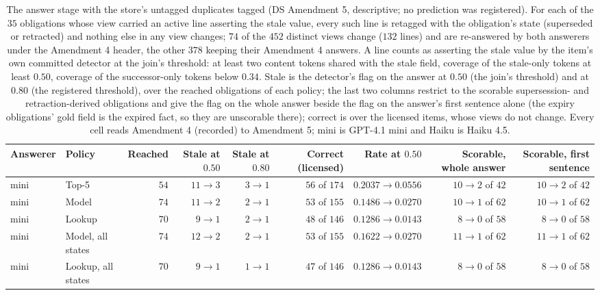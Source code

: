 \begin{table}[H]
\caption{The answer stage with the store's untagged duplicates tagged (DS Amendment 5, descriptive; no prediction was registered). For each of the $35$ obligations whose view carried an active line asserting the stale value, every such line is retagged with the obligation's state (superseded or retracted) and nothing else in any view changes; $74$ of the $452$ distinct views change ($132$ lines) and are re-answered by both answerers under the Amendment 4 header, the other $378$ keeping their Amendment 4 answers. A line counts as asserting the stale value by the item's own committed detector at the join's threshold: at least two content tokens shared with the stale field, coverage of the stale-only tokens at least $0.50$, coverage of the successor-only tokens below $0.34$. Stale is the detector's flag on the answer at $0.50$ (the join's threshold) and at $0.80$ (the registered threshold), over the reached obligations of each policy; the last two columns restrict to the scorable supersession- and retraction-derived obligations and give the flag on the whole answer beside the flag on the answer's first sentence alone (the expiry obligations' gold field is the expired fact, so they are unscorable there); correct is over the licensed items, whose views do not change. Every cell reads Amendment 4 (recorded) to Amendment 5; mini is GPT-4.1 mini and Haiku is Haiku 4.5.}
\label{tab:ds-a5}\centering\tiny\setlength{\tabcolsep}{2pt}
\begin{tabular}{@{}llrrrrrrr@{}}\toprule
Answerer & Policy & Reached & Stale at $0.50$ & Stale at $0.80$ & Correct (licensed) & Rate at $0.50$ & Scorable, whole answer & Scorable, first sentence \\ \midrule
mini & Top-5 & $54$ & $11 \to 3$ & $3 \to 1$ & $56$ of $174$ & $0.2037 \to 0.0556$ & $10 \to 2$ of $42$ & $10 \to 2$ of $42$ \\
mini & Model & $74$ & $11 \to 2$ & $2 \to 1$ & $53$ of $155$ & $0.1486 \to 0.0270$ & $10 \to 1$ of $62$ & $10 \to 1$ of $62$ \\
mini & Lookup & $70$ & $9 \to 1$ & $2 \to 1$ & $48$ of $146$ & $0.1286 \to 0.0143$ & $8 \to 0$ of $58$ & $8 \to 0$ of $58$ \\
mini & Model, all states & $74$ & $12 \to 2$ & $2 \to 1$ & $53$ of $155$ & $0.1622 \to 0.0270$ & $11 \to 1$ of $62$ & $11 \to 1$ of $62$ \\
mini & Lookup, all states & $70$ & $9 \to 1$ & $1 \to 1$ & $47$ of $146$ & $0.1286 \to 0.0143$ & $8 \to 0$ of $58$ & $8 \to 0$ of $58$ \\

\end{tabular}
\end{table}

